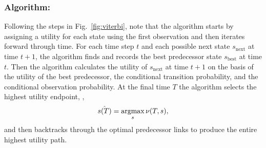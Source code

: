 \subsubsection*{Algorithm:}
Following the steps in Fig.~\ref{fig:viterbi}, note that the algorithm
starts by assigning a utility for each state using the first
observation and then iterates forward through time.  For each time
step $t$ and each possible next state $s_\text{next}$ at time $t+1$,
the algorithm finds and records the best predecessor state $s_\text{best}$
at time $t$.  Then the algorithm calculates the utility of
$s_\text{next}$ at time $t+1$ on the basis of the utility of the best
predecessor, the conditional transition probability, and the
conditional observation probability.  At the final time $T$ the
algorithm selects the highest utility endpoint, \ie,
\begin{equation*}
  \hat {{s}{(T)}} = \operatorname*{argmax}_s \nu(T,s),
\end{equation*}
and then backtracks through the optimal predecessor links to produce
the entire highest utility path.
